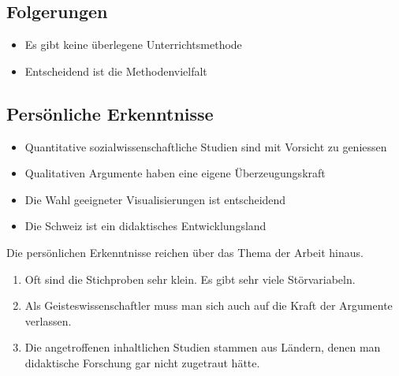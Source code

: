 \documentclass[
  letterpaper,
  DIV=11,
  numbers=noendperiod]{scrartcl}
\providecommand{\tightlist}{%
  \setlength{\itemsep}{0pt}\setlength{\parskip}{0pt}}\usepackage{longtable,booktabs,array}
\begin{document}
\subsection{Folgerungen}\label{folgerungen}

\begin{tcolorbox}[enhanced jigsaw, opacityback=0, arc=.35mm, coltitle=black, opacitybacktitle=0.6, title={Konsequenzen für den Unterricht}, bottomrule=.15mm, colbacktitle=quarto-callout-note-color!10!white, toprule=.15mm, bottomtitle=1mm, breakable, toptitle=1mm, left=2mm, rightrule=.15mm, leftrule=.75mm, colframe=quarto-callout-note-color-frame, titlerule=0mm, colback=white]

\begin{itemize}
\tightlist
\item
  Es gibt keine überlegene Unterrichtsmethode
\item
  Entscheidend ist die Methodenvielfalt
\end{itemize}

\end{tcolorbox}

\subsection{Persönliche Erkenntnisse}\label{persuxf6nliche-erkenntnisse}

\begin{itemize}
\tightlist
\item
  Quantitative sozialwissenschaftliche Studien sind mit Vorsicht zu
  geniessen
\item
  Qualitativen Argumente haben eine eigene Überzeugungskraft
\item
  Die Wahl geeigneter Visualisierungen ist entscheidend
\item
  Die Schweiz ist ein didaktisches Entwicklungsland
\end{itemize}

Die persönlichen Erkenntnisse reichen über das Thema der Arbeit hinaus.

\begin{enumerate}
\def\labelenumi{\arabic{enumi}.}
\tightlist
\item
  Oft sind die Stichproben sehr klein. Es gibt sehr viele Störvariabeln.
\item
  Als Geisteswissenschaftler muss man sich auch auf die Kraft der
  Argumente verlassen.
\item
  Die angetroffenen inhaltlichen Studien stammen aus Ländern, denen man
  didaktische Forschung gar nicht zugetraut hätte.
\end{enumerate}
\end{document}
